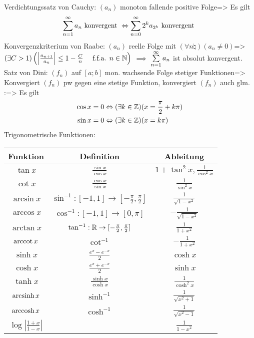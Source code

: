 \theorem Verdichtungssatz von Cauchy:
  $(a_n)$ monoton fallende positive Folge=>{
  Es gilt
  \[\sumn 1 a_n \text{ konvergent } \equiv
    \sumn 0 2^k a_{2^k} \text{ konvergent }
    \]
  }
\theorem Konvergenzkriterium von Raabe:
  $(a_n)$ reelle Folge mit $(\forall n\natural)(a_n\ne 0)$=>{
  $(\exists C>1)\left(\left|\frac{a_{n+1}}{a_n}\right|\le 1-\frac C n\quad 
    \text{ f.f.a. } n\in\mathbb N\right)$
  $\implies$ $\sumn 1 a_n$ ist absolut konvergent.
  }
\theorem Satz von Dini:
  $(f_n)$ auf $[a;b]$ mon. wachsende Folge stetiger Funktionen=>{
  Konvergiert $(f_n)$ pw gegen eine stetige Funktion, konvergiert $(f_n)$
  auch glm.
  }
\theorem:=>{
  Es gilt
  \begin{align*}
    \cos x=0 &\Leftrightarrow (\exists k\in\mathbb Z)(x=\frac \pi 2+k\pi)\\
    \sin x=0 &\Leftrightarrow (\exists k\in\mathbb Z)(x=k\pi)
    \end{align*}
  }
 Trigonometrische Funktionen:{
  \begin{tabular}{|c|c|c|}
    \hline
    Funktion & Definition & Ableitung \\
    \hline
    $\tan x$ & $\frac{\sin x}{\cos x}$ & $1+\tan^2 x, \frac 1 {\cos^2 x}$ \\[2mm]
    $\cot x$ & $\frac{\cos x}{\sin x}$ & $\frac 1 {\sin^2 x}$ \\[2mm]
    \hline
    $\arcsin x$ & $\sin^{-1}:[-1,1]\to[-\frac \pi 2,\frac\pi 2]$ & $\frac 1 {\sqrt{1-x^2}}$ \\[2mm]
    $\arccos x$ & $\cos^{-1}:[-1,1]\to[0,\pi]$ & $-\frac 1 {\sqrt{1-x^2}}$ \\[2mm]
    $\arctan x$ & $\tan^{-1}:\mathbb R \to[-\frac \pi 2,\frac\pi 2]$ & $\frac 1 {1+x^2}$ \\[2mm]
    $\operatorname{arccot} x$ & $\cot^{-1}$ & $-\frac 1 {1+x^2}$ \\[2mm]
    \hline
    $\sinh x$ & $\frac{e^x -e^{-x}}2$ & $\cosh x$ \\[2mm]
    $\cosh x$ & $\frac{e^x +e^{-x}}2$ & $\sinh x$ \\[2mm]
    $\tanh x$ & $\frac{\sinh x}{\cosh x}$ & $\frac 1 {\cosh^2 x}$ \\[2mm]
    \hline
    $\operatorname{arcsinh} x$ & $\sinh^{-1}$ & $\frac 1 {\sqrt{x^2+1}}$ \\[2mm]
    $\operatorname{arccosh} x$ & $\cosh^{-1}$ & $\frac 1 {\sqrt{x^2-1}}$ \\[2mm]
    \hline
    $\log\left|\frac{1+x}{1-x}\right|$ & & $\frac 1 {1-x^2}$ \\[2mm]
    \hline
    \end{tabular}
  }
